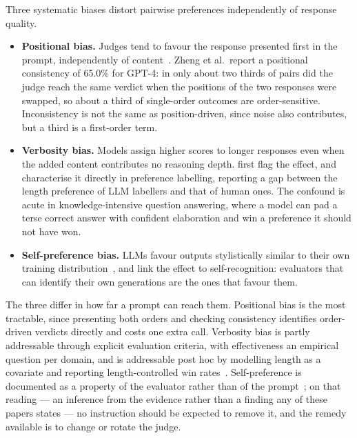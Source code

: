 Three systematic biases distort pairwise preferences independently of
response quality.

\begin{itemize}
    \item \textbf{Positional bias.} Judges tend to favour the
    response presented first in the prompt, independently of
    content~\parencite{zheng2023judging}. Zheng et al.\ report a
    positional consistency of 65.0\% for GPT-4: in only about two
    thirds of pairs did the judge reach the same verdict when the
    positions of the two responses were swapped, so about a third of
    single-order outcomes are order-sensitive. Inconsistency is not
    the same as position-driven, since noise also contributes, but a
    third is a first-order term.

    \item \textbf{Verbosity bias.} Models assign higher scores to
    longer responses even when the added content contributes no
    reasoning depth. \textcite{zheng2023judging} first flag the
    effect, and \textcite{saito2023verbosity} characterise it
    directly in preference labelling, reporting a gap between the
    length preference of LLM labellers and that of human ones. The
    confound is
    acute in knowledge-intensive question answering, where a model
    can pad a terse correct answer with confident elaboration and win
    a preference it should not have won.

    \item \textbf{Self-preference bias.} LLMs favour outputs
    stylistically similar to their own training
    distribution~\parencite{wataoka2025selfpreference,
    panickssery2024llm}, and \textcite{panickssery2024llm} link the
    effect to self-recognition: evaluators that can identify their
    own generations are the ones that favour them.
\end{itemize}

The three differ in how far a prompt can reach them. Positional bias
is the most tractable, since presenting both orders and checking
consistency identifies order-driven verdicts directly and costs one
extra call. Verbosity bias is partly addressable through explicit
evaluation criteria, with effectiveness an empirical question per
domain, and is addressable post hoc by modelling length as a
covariate and reporting length-controlled win
rates~\parencite{dubois2024lengthcontrolled}. Self-preference is
documented as a property of the evaluator rather than of the
prompt~\parencite{panickssery2024llm}; on that reading --- an
inference from the evidence rather than a finding any of these papers
states --- no instruction should be expected to remove it, and the
remedy available is to change or rotate the judge.

